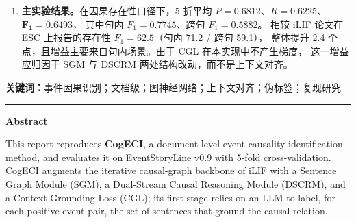 \begin{enumerate}
        \emph{逐位相同}的训练轨迹（$F_1$ 均为 \texttt{0.6110381077529566}，最优轮次同为 26），
        而首轮训练损失却相差 8.66（8.7606 对 0.1026）。代码级核查定位到
        \texttt{model/model.py} 中的 \texttt{(cosine\_sim > flag).float()}：
        比较运算返回不可导的布尔张量，\texttt{.float()} 只做类型转换、不恢复计算图，
        实测该张量 \texttt{requires\_grad=False}、单独反传即报错。故
        $\partial \mathcal{L}_{\mathrm{CGL}}/\partial \theta \equiv 0$，
        \textbf{整条 Stage-1 LLM 伪标签链路对本实现的训练没有任何贡献}。
        本文进而用直通估计器补回梯度并做了同预算对照：梯度接通后，E3 在前 12 轮里
        \emph{每一轮}都落后于 E1（平均验证 $F_1$ 低 9.7 个点），说明在当前权重与
        伪标签形态下，CGL 的梯度对主任务是净负担而非增益。
  \item \textbf{主实验结果。}在因果存在性口径下，5 折平均
        $P=0.6812$、$R=0.6225$、$\bm{F_1=0.6493}$，
        其中句内 $F_1=0.7745$、跨句 $F_1=0.5882$。
        相较 iLIF 论文在 ESC 上报告的存在性 $F_1=62.5$（句内 71.2 / 跨句 59.1），
        整体提升 2.4 个点，且增益主要来自句内场景。由于 CGL 在本实现中不产生梯度，
        这一增益应归因于 SGM 与 DSCRM 两处结构改动，而不是上下文对齐。
\end{enumerate}

\vspace{0.5em}
\noindent\textbf{关键词：}事件因果识别；文档级；图神经网络；上下文对齐；伪标签；复现研究

\vspace{1.2em}
\begin{center}
  \rule{0.85\textwidth}{0.4pt}
\end{center}
\vspace{0.3em}

\begin{center}
  \textbf{\large Abstract}
\end{center}

\vspace{-0.5em}
\noindent
This report reproduces \textbf{CogECI}, a document-level event causality identification
method, and evaluates it on EventStoryLine v0.9 with 5-fold cross-validation.
CogECI augments the iterative causal-graph backbone of iLIF with a Sentence Graph Module (SGM),
a Dual-Stream Causal Reasoning Module (DSCRM), and a Context Grounding Loss (CGL);
its first stage relies on an LLM to label, for each positive event pair, the set of sentences
that ground the causal relation.

